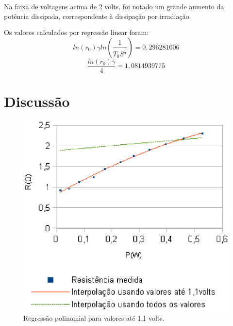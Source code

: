 \documentclass[brazilian,12pt,a4paper,twocolumn,final]{article}
\begin{document}
Na faixa de voltagens acima de 2 volts, foi notado um grande aumento da
potência dissipada, correspondente à dissipação por irradiação.

Os valores calculados por regressão linear foram:
$$ln(r_0)\gamma ln(\frac{1}{T_0S^\frac{1}{4}}) = 0,296281006$$
$$\frac{ln(r_0)\gamma}{4}=1,0814939775$$

\section{Discussão}

\begin{figure}[h]
  \caption{Regressão polinomial para valores até 1,1 volts.}
  \label{figiniciopeq}
  \centering
    \includegraphics{iniciopeq.eps}
\end{figure}
\end{document}
